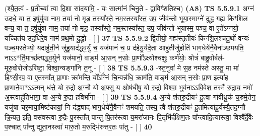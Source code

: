 \documentclass[17pt]{extarticle}
\begin{document}
                  \newline
                      (श्यै॒त॒त्वं - प्र॒तीच्या᳚ त्वा दि॒शा सा॑दयामि॒ - यः सात्मा॑नं चिनु॒ते - द्वाविꣳ॑शतिश्च)  \textbf{(A8)} \newline \newline
                                        \textbf{ TS 5.5.9.1} \newline
                  अग्न॑ उदधे॒ या त॒ इषु॑र्यु॒वा नाम॒ तया॑ नो मृड॒ तस्या᳚स्ते॒ नम॒स्तस्या᳚स्त॒ उप॒ जीव॑न्तो भूया॒स्माग्ने॑ दुद्ध्र गह्य किꣳशिल वन्य॒ या त॒ इषु॑र्यु॒वा नाम॒ तया॑ नो मृड॒ तस्या᳚स्ते॒ नम॒स्तस्या᳚स्त॒ उप॒ जीव॑न्तो भूयास्म॒ पञ्च॒ वा ए॒ते᳚ऽग्नयो॒ यच्चित॑य उद॒धिरे॒व नाम॑ प्रथ॒मो दु॒द्ध्रो - [  ] \textbf{  37} \newline
                  \newline
                                \textbf{ TS 5.5.9.2} \newline
                  द्वि॒तीयो॒ गह्य॑स्तृ॒तीयः॑ किꣳशि॒लश्च॑तु॒र्थो वन्यः॑ पञ्च॒मस्तेभ्यो॒ यदाहु॑ती॒र्न जु॑हु॒याद॑द्ध्व॒र्युं च॒ यज॑मानं च॒ प्र द॑हेयु॒र्यदे॒ता आहु॑तीर्जु॒होति॑ भाग॒धेये॑नै॒वैना᳚ञ्छमयति॒ नाऽऽ*र्ति॒मार्च्छ॑त्यद्ध्व॒र्युर्न यज॑मानो॒ वाङ्म॑ आ॒सन् न॒सोः प्रा॒णो᳚ऽक्ष्योश्चक्षुः॒ कर्ण॑योः॒ श्रोत्रं॑ बाहु॒वोर्बल॑-मूरु॒वोरोजोऽरि॑ष्टा॒ विश्वा॒न्यङ्गा॑नि त॒नू - [  ] \textbf{  38} \newline
                  \newline
                                \textbf{ TS 5.5.9.3} \newline
                  -स्त॒नुवा॑ मे स॒ह नम॑स्ते अस्तु॒ मा मा॑ हिꣳसी॒रप॒ वा ए॒तस्मा᳚त् प्रा॒णाः क्रा॑मन्ति॒ यो᳚ऽग्निं चि॒न्वन्न॑धि॒ क्राम॑ति॒ वाङ्म॑ आ॒सन् न॒सोः प्रा॒ण इत्या॑ह प्रा॒णाने॒वा*ऽऽत्मन् ध॑त्ते॒ यो रु॒द्रो अ॒ग्नौ यो अ॒फ्सु य ओष॑धीषु॒ यो रु॒द्रो विश्वा॒ भुव॑नाऽऽवि॒वेश॒ तस्मै॑ रु॒द्राय॒ नमो॑ अ॒स्त्वाहु॑तिभागा॒ वा अ॒न्ये रु॒द्रा ह॒विर्भा॑गा - [  ] \textbf{  39} \newline
                  \newline
                                \textbf{ TS 5.5.9.4} \newline
                  अ॒न्ये श॑तरु॒द्रीयꣳ॑ हु॒त्वा गा॑वीधु॒कं च॒रुमे॒तेन॒ यजु॑षा चर॒माया॒मिष्ट॑कायां॒ नि द॑द्ध्याद्-भाग॒धेये॑नै॒वैनꣳ॑ शमयति॒ तस्य॒ त्वै श॑तरु॒द्रीयꣳ॑ हु॒तमित्या॑हु॒र्यस्यै॒तद॒ग्नौ क्रि॒यत॒ इति॒ वस॑वस्त्वा रु॒द्रैः पु॒रस्ता᳚त् पान्तु पि॒तर॑स्त्वा य॒मरा॑जानः पि॒तृभि॑र्दक्षिण॒तः पा᳚न्त्वादि॒त्यास्त्वा॒ विश्वै᳚र्दे॒वैः प॒श्चात् पा᳚न्तु द्युता॒नस्त्वा॑ मारु॒तो म॒रुद्भि॑रुत्तर॒तः पा॑तु - [  ] \textbf{  40} \newline
                  \newline
\end{document}
